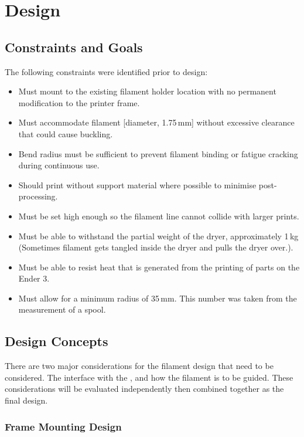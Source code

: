 \section{Design}

\subsection{Constraints and Goals} \label{Sec:ConstraintsandGoals}

The following constraints were identified prior to design:

\begin{itemize}
	\item Must mount to the existing filament holder location with no
	permanent modification to the printer frame.
	\item Must accommodate filament [diameter, 1.75\,mm]
	without excessive clearance that could cause buckling.
	\item Bend radius must be sufficient to prevent filament binding or
	fatigue cracking during continuous use.
	\item Should print without support material where possible to
	minimise post-processing.
	\item Must be set high enough so the filament line cannot collide with larger prints. 
	\item Must be able to withstand the partial weight of the dryer, approximately 1\,kg (Sometimes filament gets tangled inside the dryer and pulls the dryer over.).  
	\item Must be able to resist heat that is generated from the printing of parts 
	on the Ender 3. 
	\item Must allow  for a minimum radius of 35\,mm. This number was taken from the measurement of a spool. 
	 
\end{itemize}

\subsection{Design Concepts}
There are two major considerations for the filament design that need to be considered.
 The interface with the \Printername, and how the filament is to be guided. These considerations
  will be evaluated independently then combined together as the final design. 
  

\subsubsection{Frame Mounting Design}
